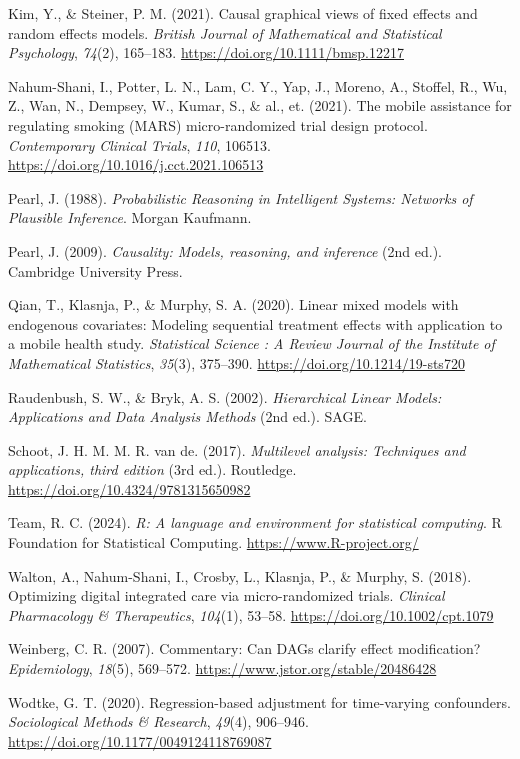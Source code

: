 \documentclass[
  11pt,
  a4paper,
]{article}
\newlength{\cslhangindent}
\newenvironment{CSLReferences}[2] %
 {\begin{list}{}{%
  \setlength{\itemindent}{0pt}
  \setlength{\leftmargin}{0pt}
  \setlength{\parsep}{0pt}
  \ifodd #1
   \setlength{\leftmargin}{\cslhangindent}
   \setlength{\itemindent}{-1\cslhangindent}
  \fi
  \setlength{\itemsep}{#2\baselineskip}}}
 {\end{list}}
\begin{document}
\begin{CSLReferences}{1}{0}
Kim, Y., \& Steiner, P. M. (2021). Causal graphical views of fixed
effects and random effects models. \emph{British Journal of Mathematical
and Statistical Psychology}, \emph{74}(2), 165--183.
\url{https://doi.org/10.1111/bmsp.12217}

Nahum-Shani, I., Potter, L. N., Lam, C. Y., Yap, J., Moreno, A.,
Stoffel, R., Wu, Z., Wan, N., Dempsey, W., Kumar, S., \& al., et.
(2021). The mobile assistance for regulating smoking (MARS)
micro-randomized trial design protocol. \emph{Contemporary Clinical
Trials}, \emph{110}, 106513.
\url{https://doi.org/10.1016/j.cct.2021.106513}

Pearl, J. (1988). \emph{Probabilistic Reasoning in Intelligent Systems:
Networks of Plausible Inference}. Morgan Kaufmann.

Pearl, J. (2009). \emph{Causality: Models, reasoning, and inference}
(2nd ed.). Cambridge University Press.

Qian, T., Klasnja, P., \& Murphy, S. A. (2020). Linear mixed models with
endogenous covariates: Modeling sequential treatment effects with
application to a mobile health study. \emph{Statistical Science : A
Review Journal of the Institute of Mathematical Statistics},
\emph{35}(3), 375--390. \url{https://doi.org/10.1214/19-sts720}

Raudenbush, S. W., \& Bryk, A. S. (2002). \emph{Hierarchical Linear
Models: Applications and Data Analysis Methods} (2nd ed.). SAGE.

Schoot, J. H. M. M. R. van de. (2017). \emph{Multilevel analysis:
Techniques and applications, third edition} (3rd ed.). Routledge.
\url{https://doi.org/10.4324/9781315650982}

Team, R. C. (2024). \emph{R: A language and environment for statistical
computing}. R Foundation for Statistical Computing.
\url{https://www.R-project.org/}

Walton, A., Nahum-Shani, I., Crosby, L., Klasnja, P., \& Murphy, S.
(2018). Optimizing digital integrated care via micro-randomized trials.
\emph{Clinical Pharmacology \& Therapeutics}, \emph{104}(1), 53--58.
\url{https://doi.org/10.1002/cpt.1079}

Weinberg, C. R. (2007). Commentary: Can DAGs clarify effect
modification? \emph{Epidemiology}, \emph{18}(5), 569--572.
\url{https://www.jstor.org/stable/20486428}

Wodtke, G. T. (2020). Regression-based adjustment for time-varying
confounders. \emph{Sociological Methods \& Research}, \emph{49}(4),
906--946. \url{https://doi.org/10.1177/0049124118769087}

\end{CSLReferences}
\end{document}
